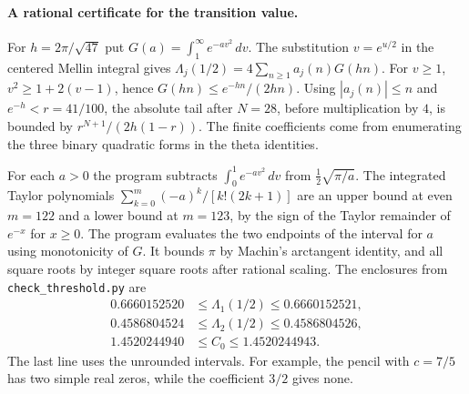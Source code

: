 \paragraph{A rational certificate for the transition value.}
For $h=2\pi/\sqrt{47}$ put $G(a)=\int_1^\infty e^{-av^2}\,dv$.
The substitution $v=e^{u/2}$ in the centered Mellin integral gives
$\Lambda_j(1/2)=4\sum_{n\ge1}a_j(n)G(hn)$.
For $v\ge1$, $v^2\ge1+2(v-1)$, hence
$G(hn)\le e^{-hn}/(2hn)$.
Using $|a_j(n)|\le n$ and $e^{-h}<r=41/100$, the absolute tail after $N=28$,
before multiplication by $4$, is bounded by
$r^{N+1}/(2h(1-r))$. The finite coefficients come from enumerating the three
binary quadratic forms in the theta identities.

For each $a>0$ the program subtracts
$\int_0^1e^{-av^2}\,dv$ from $\tfrac12\sqrt{\pi/a}$.
The integrated Taylor polynomials
$\sum_{k=0}^{m}(-a)^k/[k!(2k+1)]$ are an upper bound at even $m=122$ and a
lower bound at $m=123$, by the sign of the Taylor remainder of $e^{-x}$ for
$x\ge0$. The program evaluates the two endpoints of the interval for $a$
using monotonicity of $G$. It bounds $\pi$ by Machin's arctangent identity,
and all square roots by integer square roots after rational scaling. The
enclosures from \texttt{check\_threshold.py} are
\[
\begin{split}
 0.6660152520&\le\Lambda_1(1/2)\le0.6660152521,\\
 0.4586804524&\le\Lambda_2(1/2)\le0.4586804526,\\
 1.4520244940&\le C_0\le1.4520244943 .
\end{split}
\]
The last line uses the unrounded intervals. For example, the pencil with
$c=7/5$ has two simple real zeros, while the coefficient $3/2$
gives none.
